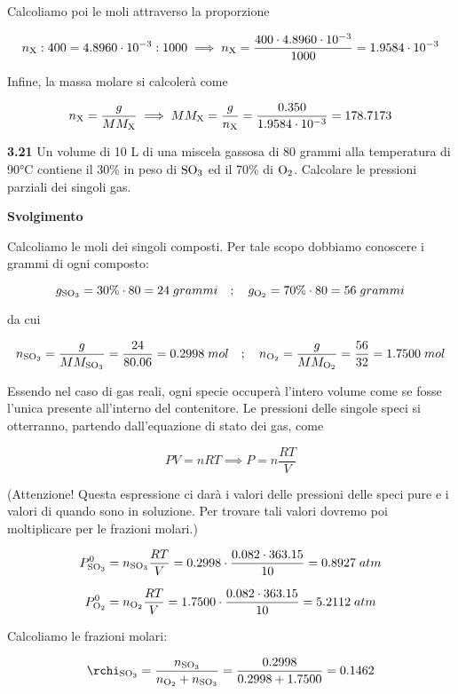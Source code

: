Calcoliamo poi le moli attraverso la proporzione

$$n_{\rm X}:400=4.8960 \cdot 10^{-3}:1000
\implies
n_{\rm X}=\frac{400 \cdot 4.8960 \cdot 10^{-3}}{1000}
=1.9584 \cdot 10^{-3}$$

Infine, la massa molare si calcolerà come

$$n_{\rm X}=\frac{g}{MM_{\rm X}}
\implies
MM_{\rm X}=\frac{g}{n_{\rm X}}=\frac{0.350}{1.9584 \cdot 10^{-3}}=178.7173$$

\vspace{0.2cm}\textbf{3.21} Un volume di 10 L di una miscela gassosa di 80 grammi alla temperatura di 90°C contiene il
30\% in peso di $\rm SO_3$ ed il 70\% di $\rm O_2$. Calcolare le pressioni parziali dei singoli gas.

\vspace{0.2cm}\large\textbf{Svolgimento}\normalsize

\vspace{0.2cm}Calcoliamo le moli dei singoli composti. Per tale scopo dobbiamo conoscere i grammi di ogni composto:

$$g_{\rm SO_3}=30\% \cdot 80=24\;grammi
\quad;\quad
g_{\rm O_2}=70\% \cdot 80=56\;grammi$$

da cui

\vspace{-0.2cm}$$n_{\rm SO_3}=\frac{g}{MM_{\rm SO_3}}=\frac{24}{80.06}=0.2998\;mol
\quad;\quad
n_{\rm O_2}=\frac{g}{MM_{\rm O_2}}=\frac{56}{32}=1.7500\;mol$$

Essendo nel caso di gas reali, ogni specie occuperà l'intero volume come se fosse l'unica presente all'interno del contenitore. Le pressioni delle singole speci si otterranno, partendo dall'equazione di stato dei gas, come

$$PV=nRT \implies
P=n\frac{RT}{V}$$

(Attenzione! Questa espressione ci darà i valori delle pressioni delle speci pure e i valori di quando sono in soluzione. Per trovare tali valori dovremo poi moltiplicare per le frazioni molari.)

$$P^0_{\rm SO_3}=n_{\rm SO_3} \displaystyle \frac{RT}{V}
=0.2998 \cdot \frac{0.082 \cdot 363.15}{10}
=0.8927\;atm$$

$$P^0_{\rm O_2}=n_{\rm O_2} \displaystyle \frac{RT}{V}
=1.7500 \cdot \frac{0.082 \cdot 363.15}{10}
=5.2112\;atm$$

Calcoliamo le frazioni molari:

$$\rchi_{\rm SO_3}=\frac{n_{\rm SO_3}}{n_{\rm O_2} + n_{\rm SO_3}}=\frac{0.2998}{0.2998 + 1.7500}=0.1462$$


